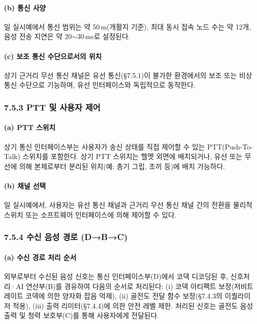 \documentclass{article}
\begin{document}
\paragraph{(b) 통신 사양}

일 실시예에서 통신 범위는 약 50\,m(개활지 기준), 최대 동시 접속 노드 수는 약 12개, 음성 전송 지연은 약 20$\sim$30\,ms로 설정된다.

\paragraph{(c) 보조 통신 수단으로서의 위치}

상기 근거리 무선 통신 채널은 유선 통신(§7.5.1)이 불가한 환경에서의 보조 또는 비상 통신 수단으로 기능하며, 유선 인터페이스와 독립적으로 동작한다.

\subsubsection{7.5.3 PTT 및 사용자 제어}

\paragraph{(a) PTT 스위치}

상기 통신 인터페이스부는 사용자가 송신 상태를 직접 제어할 수 있는 PTT(Push-To-Talk) 스위치를 포함한다. 상기 PTT 스위치는 헬멧 외면에 배치되거나, 유선 또는 무선에 의해 본체로부터 분리된 위치(예: 총기 그립, 조끼 등)에 배치 가능하다.

\paragraph{(b) 채널 선택}

일 실시예에서, 사용자는 유선 통신 채널과 근거리 무선 통신 채널 간의 전환을 물리적 스위치 또는 소프트웨어 인터페이스에 의해 제어할 수 있다.

\subsubsection{7.5.4 수신 음성 경로 (D→B→C)}

\paragraph{(a) 수신 경로 처리 순서}

외부로부터 수신된 음성 신호는 통신 인터페이스부(D)에서 코덱 디코딩된 후, 신호처리·AI 연산부(B)를 경유하여 다음의 순서로 처리된다: (i) 코덱 아티팩트 보정(저비트레이트 코덱에 의한 양자화 잡음 억제), (ii) 골전도 전달 함수 보정(§7.4.3의 이퀄라이저 적용), (iii) 출력 리미터(§7.4.4)에 의한 안전 레벨 제한. 처리된 신호는 골전도 음성 출력 및 청력 보호부(C)를 통해 사용자에게 전달된다.
\end{document}
